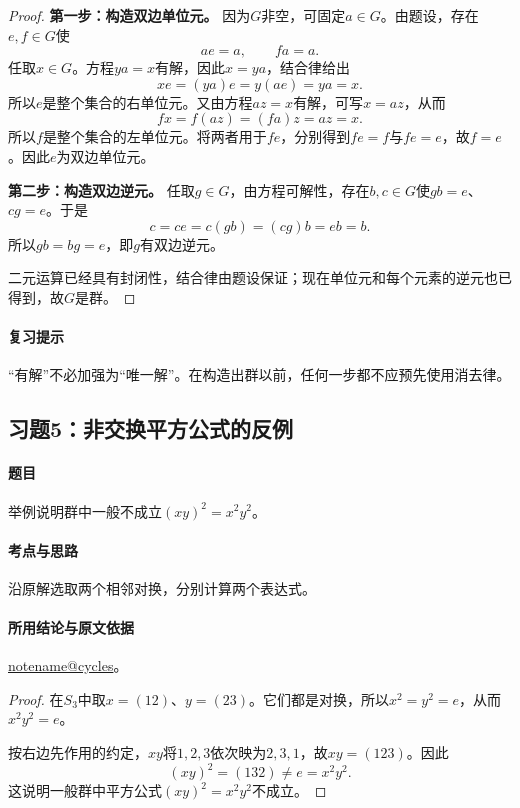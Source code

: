 \documentclass[UTF8,a4paper,11pt,fontset=windows]{ctexart}
\makeatletter
\newcommand{\noteref}[1]{\hyperref[note:#1]{\csname notename@#1\endcsname}}
\newcommand{\exref}[2]{\hyperref[ex:#1:#2]{第#1章习题#2}}
\makeatother
\begin{document}
\begin{proof}
\textbf{第一步：构造双边单位元。}
因为$G$非空，可固定$a\in G$。由题设，存在$e,f\in G$使
\[
ae=a,\qquad fa=a.
\]
任取$x\in G$。方程$ya=x$有解，因此$x=ya$，结合律给出
\[
xe=(ya)e=y(ae)=ya=x.
\]
所以$e$是整个集合的右单位元。又由方程$az=x$有解，可写$x=az$，从而
\[
fx=f(az)=(fa)z=az=x.
\]
所以$f$是整个集合的左单位元。将两者用于$fe$，分别得到$fe=f$与$fe=e$，故$f=e$。因此$e$为双边单位元。

\textbf{第二步：构造双边逆元。}
任取$g\in G$，由方程可解性，存在$b,c\in G$使$gb=e$、$cg=e$。于是
\[
c=ce=c(gb)=(cg)b=eb=b.
\]
所以$gb=bg=e$，即$g$有双边逆元。

二元运算已经具有封闭性，结合律由题设保证；现在单位元和每个元素的逆元也已得到，故$G$是群。
\end{proof}

\paragraph{复习提示}
“有解”不必加强为“唯一解”。在构造出群以前，任何一步都不应预先使用消去律。


\subsection{习题5：\texorpdfstring{非交换平方公式的反例}{非交换平方公式的反例}}
\label{ex:1:5}

\paragraph{题目}
举例说明群中一般不成立$(xy)^2=x^2y^2$。

\paragraph{考点与思路}
沿原解选取两个相邻对换，分别计算两个表达式。

\paragraph{所用结论与原文依据}
\noteref{cycles}。


\begin{proof}
在$S_3$中取$x=(12)$、$y=(23)$。它们都是对换，所以$x^2=y^2=e$，从而$x^2y^2=e$。

按右边先作用的约定，$xy$将$1,2,3$依次映为$2,3,1$，故$xy=(123)$。因此
\[
(xy)^2=(132)\ne e=x^2y^2.
\]
这说明一般群中平方公式$(xy)^2=x^2y^2$不成立。
\end{proof}
\end{document}
